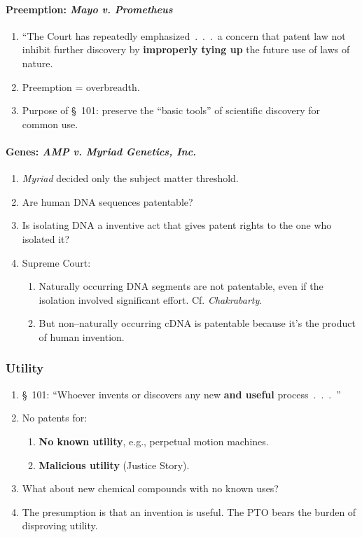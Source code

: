 \paragraph{Preemption: \emph{Mayo v. Prometheus}}

\begin{enumerate}
    \item ``The Court has repeatedly emphasized~.~.~.~a concern that patent 
    law not inhibit further discovery by \textbf{improperly tying up} the 
    future use of laws of nature.
    \item Preemption = overbreadth.
    \item Purpose of \S\ 101: preserve the ``basic tools'' of scientific 
    discovery for common use.
\end{enumerate}

\paragraph{Genes: \emph{AMP v. Myriad Genetics, Inc.}}

\begin{enumerate}
    \item \emph{Myriad} decided only the subject matter threshold.
    \item Are human DNA sequences patentable?
    \item Is isolating DNA a inventive act that gives patent rights to the one 
    who isolated it?
    \item Supreme Court:
    \begin{enumerate}
        \item Naturally occurring DNA segments are not patentable, even if the 
        isolation involved significant effort. Cf. \emph{Chakrabarty}.
        \item But non--naturally occurring cDNA is patentable because it's the 
        product of human invention.
    \end{enumerate}
\end{enumerate}

\subsubsection{Utility}

\begin{enumerate}
    \item \S\ 101: ``Whoever invents or discovers any new \textbf{and useful} 
    process~.~.~.~''
    \item No patents for:
    \begin{enumerate}
        \item \textbf{No known utility}, e.g., perpetual motion machines.
        \item \textbf{Malicious utility} (Justice Story).
    \end{enumerate}
    \item What about new chemical compounds with no known uses?
    \item The presumption is that an invention is useful. The PTO bears the 
    burden of disproving utility.
\end{enumerate}

